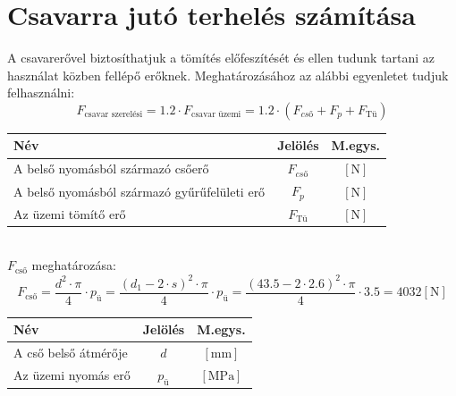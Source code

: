 \documentclass[10pt, a4paper]{article}
\newcommand{\n}{\mathrm{\left[N\right]}}
\newcommand{\mpa}{\mathrm{\left[MPa\right]}}
\newcommand{\mm}{\mathrm{\left[mm\right]}}
\begin{document}
	\section{Csavarra jutó terhelés számítása}
	A csavarerővel biztosíthatjuk a tömítés előfeszítését és ellen tudunk tartani az használat közben fellépő erőknek. Meghatározásához az alábbi egyenletet tudjuk felhasználni:
	\begin{equation}
		F_\text{csavar szerelési} = 1.2 \cdot F_\text{csavar üzemi} = 1.2 \cdot (F_{cső} + F_p + F_\text{Tü}) \tag{4}
	\end{equation}
	\vspace{-15pt}
	\renewcommand{\arraystretch}{1.4}
			\begin{table}[!h]
				\centering
				\begin{tabular}{l|c|c}
					\textbf{Név}                              & \textbf{Jelölés} & \textbf{M.egys.} \\ \hline
					A belső nyomásból származó csőerő                     & $F_{cső}$                & $\n$          \\
					A belső nyomásból származó gyűrűfelületi erő           & $F_p$                & $\n$			\\
					Az üzemi tömítő erő              & $F_\text{Tü}$                & $\n$          
				\end{tabular}
			\end{table}
	\renewcommand{\arraystretch}{1}\\
	$F_\text{cső}$ meghatározása:
	\begin{equation}
		F_\text{cső} = \dfrac{d^2 \cdot \pi}{4} \cdot p_\text{ü} = \dfrac{(d_1 - 2 \cdot s)^2 \cdot \pi}{4} \cdot p_\text{ü} = \dfrac{(43.5 - 2 \cdot 2.6)^2 \cdot \pi}{4} \cdot 3.5 = 4032 \n\tag{4.1}
	\end{equation}
	\vspace{-15pt}
	\renewcommand{\arraystretch}{1.4}
				\begin{table}[!h]
					\centering
					\begin{tabular}{l|c|c}
						\textbf{Név}                              & \textbf{Jelölés} & \textbf{M.egys.} \\ \hline
						A cső belső átmérője                     & $d$                & $\mm$          \\
						Az üzemi nyomás erő           & $p_\text{ü}$                & $\mpa$			       
					\end{tabular}
				\end{table}
		\renewcommand{\arraystretch}{1}\\
\end{document}
